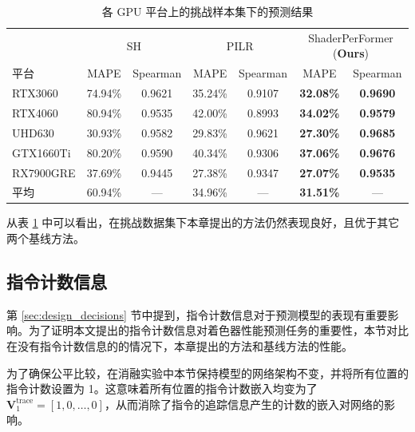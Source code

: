 \begin{table}[h]
    \centering
    \caption{各 GPU 平台上的挑战样本集下的预测结果}
    \label{table:challengeResults}
    \begin{tabular}{l|cccccc}
    \toprule
          ~   & \multicolumn{2}{c}{SH} & \multicolumn{2}{c}{PILR} & \multicolumn{2}{c}{ShaderPerFormer (\textbf{Ours})} \\
    平台       & MAPE       & Spearman    & MAPE       & Spearman    & MAPE            & Spearman          \\
    \midrule
    RTX3060   & 74.94\%     & 0.9621      & 35.24\%     & 0.9107      & \textbf{32.08\%}  & \textbf{0.9690}  \\
    RTX4060   & 80.94\%     & 0.9535      & 42.00\%     & 0.8993      & \textbf{34.02\%}  & \textbf{0.9579}  \\
    UHD630    & 30.93\%     & 0.9582      & 29.83\%     & 0.9621      & \textbf{27.30\%}  & \textbf{0.9685}  \\
    GTX1660Ti & 80.20\%     & 0.9590      & 40.34\%     & 0.9306      & \textbf{37.06\%}  & \textbf{0.9676}  \\
    RX7900GRE & 37.69\%     & 0.9445      & 27.38\%     & 0.9347      & \textbf{27.07\%}  & \textbf{0.9535}  \\
    \midrule
    平均       & 60.94\% & --- & 34.96\% & --- & \textbf{31.51\%} & --- \\
    \bottomrule
    \end{tabular}
\end{table}

{\added 从表 \ref{table:challengeResults} 中可以看出，在挑战数据集下本章提出的方法仍然表现良好，且优于其它两个基线方法。}

\subsection{指令计数信息}
\label{sec:ablation_trace}

{\amend 第 \ref{sec:design_decisions} 节中提到，指令计数信息对于预测模型的表现有重要影响。}为了证明{\amend 本文}提出的指令计数信息对着色器性能预测任务的重要性，本节对比在没有指令计数信息的的情况下，{\amend 本章提出的}方法和基线方法的性能。

为了确保公平比较，在消融实验中{\amend 本节}保持模型的网络架构不变，并将所有位置的指令计数设置为 1。这意味着所有位置的指令计数嵌入均变为了 $\mathbf{V}^\text{trace}_{1} = [1, 0, \dots, 0]$，从而消除了指令的追踪信息产生的计数的嵌入对网络的影响。

